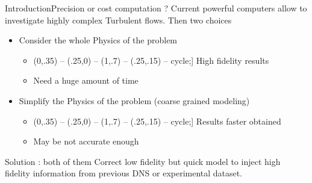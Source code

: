 \documentclass[10pt,
			   xcolor=svgnames,
			   hyperref={linkcolor=red, citecolor = DarkGreen, colorlinks=true, urlcolor=Navy}] {beamer}
\def\checkmark{\tikz\fill[scale=0.4](0,.35) -- (.25,0) -- (1,.7) -- (.25,.15) -- cycle;}
\newcommand{\warrow}{\item[\color{blue!50!black!70} \tiny{\ding{109}}]}
\newcommand{\sarrow}{\item[\color{blue!50!black!70!orange!60} \tiny{\ding{55}}]}
\newcommand{\dgreen}{\color{dgreen}}
\begin{document}
\begin{frame}{Introduction}{Precision or cost computation ?}
	 Current powerful computers allow to investigate highly complex Turbulent flows. Then two choices 
	\begin{itemize}
		\warrow Consider the whole Physics of the problem
		\begin{itemize}
			\item[\dgreen \checkmark] High fidelity results
			\sarrow Need a huge amount of time 
		\end{itemize}
		
		\warrow Simplify the Physics of the problem (coarse grained modeling)
		\begin{itemize}
			\item[\dgreen \checkmark] Results faster obtained
			\sarrow May be not accurate enough
		\end{itemize}
	\end{itemize}
	\vspace{2mm}
	\begin{exampleblock}{Solution : both of them}
		Correct low fidelity but quick model to inject high fidelity information from previous DNS or experimental dataset.\\
	\end{exampleblock}	
	\end{frame}

%
\end{document}
